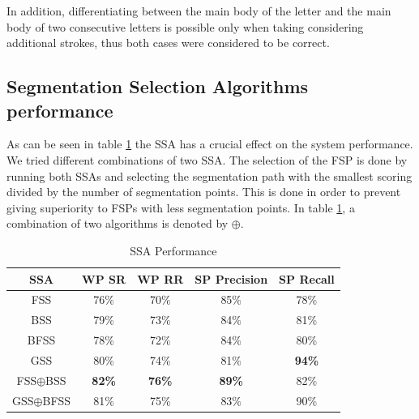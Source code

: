 \documentclass[10pt, conference, compsocconf]{IEEEtran}
\begin{document}
In addition, differentiating between the main body of the letter  and the main body of two consecutive  letters is possible only when taking considering additional strokes, thus both cases were considered to be correct.\\

\subsection{Segmentation Selection Algorithms performance}
\label{subsec:ssa_performance}
As can be seen in table \ref{table:ss_algorithms_results} the SSA has a crucial effect on the system performance. We tried different combinations of two SSA. The selection of the FSP is done by running both SSAs and selecting the segmentation path with the smallest scoring divided by the number of segmentation points. This is done in order to prevent giving superiority to FSPs with less segmentation points. In table \ref{table:ss_algorithms_results}, a combination of two algorithms is denoted by $\oplus$.

\begin{table}[h]
\caption{SSA Performance}
\renewcommand{\arraystretch}{1.2}
\begin{tabular}{ | c | c | c | c | c |}
\hline
SSA & WP SR & WP RR & SP Precision & SP Recall\\
\hline                 
  FSS & 76\% & 70\% & 85\% & 78\% \\ 
  \hline
  BSS & 79\% &  73\% & 84\%& 81\% \\
  \hline
  BFSS & 78\% & 72\% & 84\% & 80\%\\ 
  \hline
  GSS & 80\% & 74\% & 81\% & \bf{94}\% \\  
  \hline
  FSS$\oplus$BSS & \bf{82}\% & \bf{76}\% & \bf{89}\% & 82\%\\  
  \hline
  GSS$\oplus$BFSS & 81\% & 75\% & 83\% & 90\% \\
  \hline
\end{tabular}
\centering
\label{table:ss_algorithms_results} 
\end{table}
\end{document}

